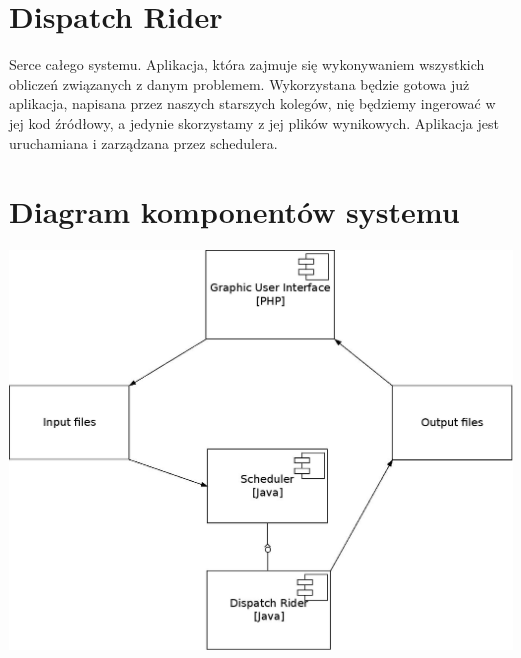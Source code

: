 \section{Dispatch Rider}
Serce całego systemu. Aplikacja, która zajmuje się wykonywaniem wszystkich obliczeń związanych z danym problemem.
Wykorzystana będzie gotowa już aplikacja, napisana przez naszych starszych kolegów, nię będziemy
ingerować w jej kod źródłowy, a jedynie skorzystamy z jej plików wynikowych. Aplikacja jest uruchamiana i zarządzana przez schedulera.

\section{Diagram komponentów systemu}

\begin{center}
\includegraphics[scale=0.35]{imgs/IO.jpeg}
\end{center}